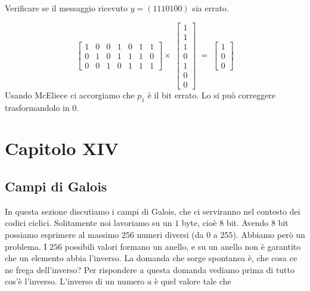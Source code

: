 \documentclass[12pt]{report}
\begin{document}
    \begin{es}
        Verificare se il messaggio ricevuto $y = (1110100)$ sia errato.

        \[
            \begin{bmatrix}
                1 & 0 & 0 & 1 & 0 & 1 & 1\\
                0 & 1 & 0 & 1 & 1 & 1 & 0\\
                0 & 0 & 1 & 0 & 1 & 1 & 1
            \end{bmatrix}
            \times
            \; \begin{bmatrix}
                   1 \\
                   1 \\
                   1 \\
                   0 \\
                   1 \\
                   0 \\
                   0
            \end{bmatrix} \; = \; \begin{bmatrix}
                                      1 \\
                                      0 \\
                                      0
            \end{bmatrix} \]
        Usando McEliece ci accorgiamo che $p_1$ è il bit errato. Lo si può correggere trasformandolo in $0$.
    \end{es}

    \chapter{Capitolo XIV}


    \section{Campi di Galois}

    In questa sezione discutiamo i campi di Galois, che ci serviranno nel contesto dei codici ciclici. Solitamente noi lavoriamo su un $1$ byte, cioè $8$ bit. Avendo $8$ bit possiamo esprimere al massimo $256$ numeri diversi (da $0$ a $255$). Abbiamo però un problema. I $256$ possibili valori formano un anello, e su un anello non è garantito che un elemento abbia l'inverso. La domanda che sorge spontanea è, che cosa ce ne frega dell'inverso? Per rispondere a questa domanda vediamo prima di tutto cos'è l'inverso. L'inverso di un numero $a$ è quel valore tale che
\end{document}
